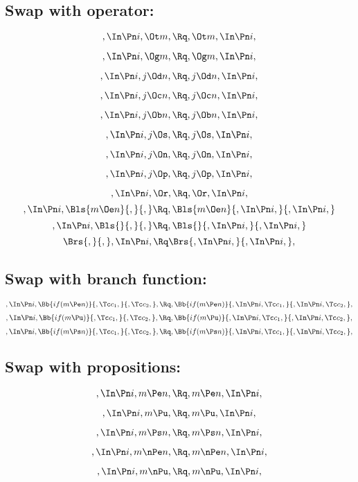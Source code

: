 \bigskip
\bigskip
\subsection{Swap with operator:}
\[,\In \Pn i, \Ot m, \Rq , \Ot m, \In \Pn i,\]

\[,\In \Pn i, \Og m, \Rq , \Og m, \In \Pn i,\]

\[,\In \Pn i, j \Od n, \Rq , j \Od n, \In \Pn i,\]

\[,\In \Pn i, j \Oc n, \Rq , j \Oc n, \In \Pn i,\]

\[,\In \Pn i, j \Ob n, \Rq , j \Ob n, \In \Pn i,\]

\[,\In \Pn i, j \Os, \Rq , j \Os, \In \Pn i,\]

\[,\In \Pn i, j \On, \Rq , j \On, \In \Pn i,\]

\[,\In \Pn i, j \Op, \Rq , j \Op, \In \Pn i,\]

\[,\In \Pn i, \Or, \Rq , \Or, \In \Pn i,\]
\bigskip
\[,\In \Pn i, \Bls{m \Oe n}{,}{,} \Rq , \Bls{m \Oe n}{,\In \Pn i,}{,\In \Pn i,}\]
\bigskip
\[,\In \Pn i, \Bls{}{,}{,} \Rq , \Bls{}{,\In \Pn i,}{,\In \Pn i,}\]
\bigskip
\[ \Brs{,}{,},\In \Pn i, \Rq \Brs{,\In \Pn i,}{,\In \Pn i,},\]



\bigskip
\bigskip
\subsection{Swap with branch function:}
\[,\In \Pn i, \Bb{if(m \Pe n)}{,\Tc c_1,}{,\Tc c_2,}, \Rq , \Bb{if(m \Pe n)}{,\In \Pn i, \Tc c_1,}{,\In \Pn i, \Tc c_2,},\]
\bigskip
\bigskip
\[,\In \Pn i, \Bb{if(m \Pu)}{,\Tc c_1,}{,\Tc c_2,}, \Rq , \Bb{if(m \Pu)}{,\In \Pn i, \Tc c_1,}{,\In \Pn i, \Tc c_2,},\]
\bigskip
\bigskip
\[,\In \Pn i, \Bb{if(m \Ps n)}{,\Tc c_1,}{,\Tc c_2,}, \Rq , \Bb{if(m \Ps n)}{,\In \Pn i, \Tc c_1,}{,\In \Pn i, \Tc c_2,},\]


\bigskip
\bigskip
\subsection{Swap with propositions:}
\[,\In \Pn i, m \Pe n, \Rq , m \Pe n, \In \Pn i,\]

\[,\In \Pn i, m \Pu, \Rq , m \Pu, \In \Pn i,\]

\[,\In \Pn i, m \Ps n, \Rq , m \Ps n, \In \Pn i,\]

\[,\In \Pn i, m \nPe n, \Rq , m \nPe n, \In \Pn i,\]

\[,\In \Pn i, m \nPu, \Rq , m \nPu, \In \Pn i,\]

